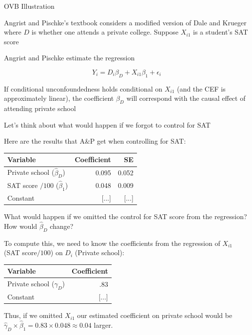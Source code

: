 \documentclass[11pt,english,handout]{beamer}
\newenvironment{wideitemize}{\itemize\addtolength{\itemsep}{10pt}}{\enditemize}
\begin{document}
\begin{frame}{OVB Illustration}
	\begin{wideitemize}
		\item
		Angrist and Pischke's textbook considers a modified version of Dale and Krueger where $D$ is whether one attends a private college. Suppose $X_{i1}$ is a student's SAT score
		
		\pause
		\item
		Angrist and Pischke estimate the regression
		
		$$Y_{i} = D_i \beta_D + X_{i1}\beta_1 + \epsilon_i $$
		
		\pause
		\item
		If conditional unconfoundedness holds conditional on $X_{i1}$ (and the CEF is approximately linear), the coefficient $\beta_D$ will correspond with the causal effect of attending private school
		
		\pause
		\item
		Let's think about what would happen if we forgot to control for SAT 
	\end{wideitemize}
\end{frame}

\begin{frame}
	\begin{wideitemize}
		\item
		Here are the results that A\&P get when controlling for SAT: \\
		\begin{tabular}{lrr}
			Variable & Coefficient & SE \\ \hline
			Private school ($\hat\beta_D$) & 0.095 & 0.052 \\
			SAT score $/ 100$ ($\hat\beta_1$) & 0.048 & 0.009 \\
			Constant & [...] & [...]
		\end{tabular}
		
		\item
		What would happen if we omitted the control for SAT score from the regression? How would $\hat\beta_D$ change? 
		
		\pause
		\item
		To compute this, we need to know the coefficients from the regression of $X_{i1}$ (SAT score$/100$) on $D_i$ (Private school):\\
		\pause
		\begin{tabular}{lr}
			Variable & Coefficient \\ \hline
			Private school ($\hat\gamma_D$) & .83 \\
			Constant & [...]
		\end{tabular}
		
		\pause
		\item 
		Thus, if we omitted $X_{i1}$ our estimated coefficient on private school would be $\hat\gamma_D \times \hat\beta_1 = 0.83 \times 0.048 \approx 0.04 $ larger.
	\end{wideitemize}
\end{frame}
\end{document}
